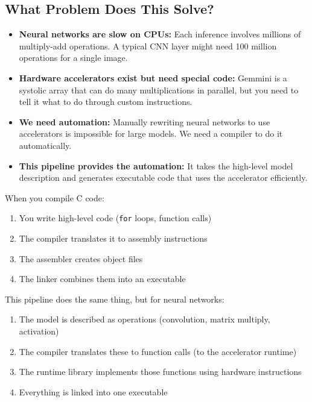 \documentclass[12pt,a4paper]{article}
\begin{document}
\subsection{What Problem Does This Solve?}

\begin{itemize}[leftmargin=*]
  \item \textbf{Neural networks are slow on CPUs:} Each inference involves millions of multiply-add operations. A typical CNN layer might need 100 million operations for a single image.
  \item \textbf{Hardware accelerators exist but need special code:} Gemmini is a systolic array that can do many multiplications in parallel, but you need to tell it what to do through custom instructions.
  \item \textbf{We need automation:} Manually rewriting neural networks to use accelerators is impossible for large models. We need a compiler to do it automatically.
  \item \textbf{This pipeline provides the automation:} It takes the high-level model description and generates executable code that uses the accelerator efficiently.
\end{itemize}

\begin{analogyenv}
When you compile C code:
\begin{enumerate}
  \item You write high-level code (\texttt{for} loops, function calls)
  \item The compiler translates it to assembly instructions
  \item The assembler creates object files
  \item The linker combines them into an executable
\end{enumerate}

This pipeline does the same thing, but for neural networks:
\begin{enumerate}
  \item The model is described as operations (convolution, matrix multiply, activation)
  \item The compiler translates these to function calls (to the accelerator runtime)
  \item The runtime library implements those functions using hardware instructions
  \item Everything is linked into one executable
\end{enumerate}
\end{analogyenv}
\end{document}

